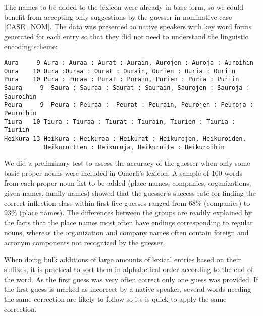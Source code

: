 \documentclass{llncs}
\begin{document}
The names to be added to the lexicon were already in base form, so we could benefit from accepting only suggestions by the guesser in nominative case [CASE=NOM]. The data was presented to native speakers with key word forms generated for each entry so that they did not need to understand the linguistic encoding scheme:
\small
\begin{verbatim}
Aura     9 Aura : Auraa : Aurat : Aurain, Aurojen : Auroja : Auroihin
Oura    10 Oura :Ouraa : Ourat : Ourain, Ourien : Ouria : Ouriin
Pura    10 Pura : Puraa : Purat : Purain, Purien : Puria : Puriin
Saura     9  Saura : Sauraa : Saurat : Saurain, Saurojen : Sauroja : Sauroihin
Peura     9  Peura : Peuraa :  Peurat : Peurain, Peurojen : Peuroja : Peuroihin
Tiura   10 Tiura : Tiuraa : Tiurat : Tiurain, Tiurien : Tiuria : Tiuriin
Heikura 13 Heikura : Heikuraa : Heikurat : Heikurojen, Heikuroiden, 
           Heikuroitten : Heikuroja, Heikuroita : Heikuroihin
\end{verbatim}
\normalsize


We did a preliminary test to assess the accuracy of the guesser when only
some basic proper nouns were included in Omorfi's lexicon. A sample of
100 words from each proper noun list to be added (place names,
companies, organizations, given names, family names) showed that the
guesser's 
success rate for finding the correct
inflection class within first five guesses ranged from 68\% (companies) to 93\% (place
names). The differences between the groups are readily explained by
the facts that the place names most often have endings corresponding
to regular nouns, whereas the organization and company names often
contain foreign and acronym components not recognized by the guesser.

When doing bulk additions of large amounts of lexical entries based on their suffixes, it is practical to sort them in alphabetical order according to the end of the word. As the first guess was very often correct only one guess was provided. If the first guess is marked as incorrect by a native speaker, several words needing the same correction are likely to follow so its is quick to apply the same correction.
\end{document}

